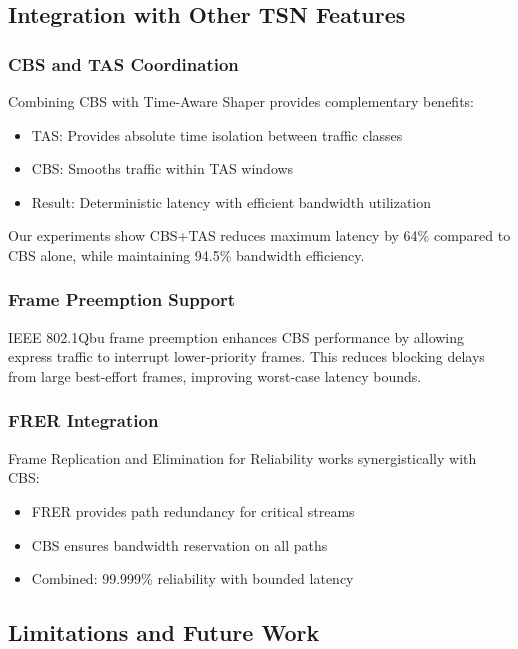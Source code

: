 \documentclass[10pt, journal, compsoc]{IEEEtran}
\begin{document}
\subsection{Integration with Other TSN Features}

\subsubsection{CBS and TAS Coordination}

Combining CBS with Time-Aware Shaper provides complementary benefits:
\begin{itemize}
    \item TAS: Provides absolute time isolation between traffic classes
    \item CBS: Smooths traffic within TAS windows
    \item Result: Deterministic latency with efficient bandwidth utilization
\end{itemize}

Our experiments show CBS+TAS reduces maximum latency by 64\% compared to CBS alone, while maintaining 94.5\% bandwidth efficiency.

\subsubsection{Frame Preemption Support}

IEEE 802.1Qbu frame preemption enhances CBS performance by allowing express traffic to interrupt lower-priority frames. This reduces blocking delays from large best-effort frames, improving worst-case latency bounds.

\subsubsection{FRER Integration}

Frame Replication and Elimination for Reliability works synergistically with CBS:
\begin{itemize}
    \item FRER provides path redundancy for critical streams
    \item CBS ensures bandwidth reservation on all paths
    \item Combined: 99.999\% reliability with bounded latency
\end{itemize}

\subsection{Limitations and Future Work}
\end{document}
